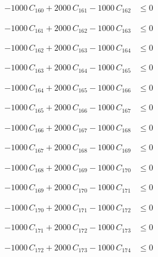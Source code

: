 \documentclass[a4paper,11pt]{article}
\begin{document}
\begin{align}
-1000\,C_{160} + 2000\,C_{161} - 1000\,C_{162} &\leq 0 \nonumber
\end{align}

\begin{align}
-1000\,C_{161} + 2000\,C_{162} - 1000\,C_{163} &\leq 0 \nonumber
\end{align}

\begin{align}
-1000\,C_{162} + 2000\,C_{163} - 1000\,C_{164} &\leq 0 \nonumber
\end{align}

\begin{align}
-1000\,C_{163} + 2000\,C_{164} - 1000\,C_{165} &\leq 0 \nonumber
\end{align}

\begin{align}
-1000\,C_{164} + 2000\,C_{165} - 1000\,C_{166} &\leq 0 \nonumber
\end{align}

\begin{align}
-1000\,C_{165} + 2000\,C_{166} - 1000\,C_{167} &\leq 0 \nonumber
\end{align}

\begin{align}
-1000\,C_{166} + 2000\,C_{167} - 1000\,C_{168} &\leq 0 \nonumber
\end{align}

\begin{align}
-1000\,C_{167} + 2000\,C_{168} - 1000\,C_{169} &\leq 0 \nonumber
\end{align}

\begin{align}
-1000\,C_{168} + 2000\,C_{169} - 1000\,C_{170} &\leq 0 \nonumber
\end{align}

\begin{align}
-1000\,C_{169} + 2000\,C_{170} - 1000\,C_{171} &\leq 0 \nonumber
\end{align}

\begin{align}
-1000\,C_{170} + 2000\,C_{171} - 1000\,C_{172} &\leq 0 \nonumber
\end{align}

\begin{align}
-1000\,C_{171} + 2000\,C_{172} - 1000\,C_{173} &\leq 0 \nonumber
\end{align}

\begin{align}
-1000\,C_{172} + 2000\,C_{173} - 1000\,C_{174} &\leq 0 \nonumber
\end{align}
\end{document}
